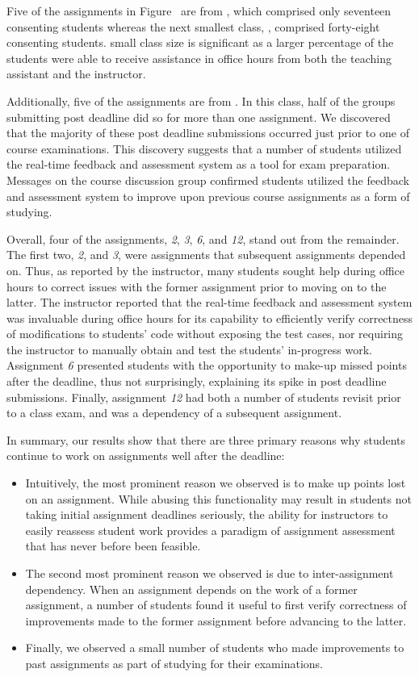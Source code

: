 Five of the assignments in Figure~ are from ,
which comprised only seventeen consenting students whereas the next smallest
class, , comprised forty-eight consenting students. 
small class size is significant as a larger percentage of the students were
able to receive assistance in office hours from both the teaching assistant and
the instructor.

Additionally, five of the assignments are from . In this class, half
of the groups submitting post deadline did so for more than one assignment. We
discovered that the majority of these post deadline submissions occurred just
prior to one of  course examinations. This discovery suggests that
a number of students utilized the real-time feedback and assessment system as a
tool for exam preparation. Messages on the course discussion group confirmed
students utilized the feedback and assessment system to improve upon previous
course assignments as a form of studying.

Overall, four of the assignments, \emph{2}, \emph{3}, \emph{6}, and \emph{12},
stand out from the remainder. The first two, \emph{2}, and \emph{3}, were
assignments that subsequent assignments depended on. Thus, as reported by the
instructor, many students sought help during office hours to correct issues
with the former assignment prior to moving on to the latter. The instructor
reported that the real-time feedback and assessment system was invaluable
during office hours for its capability to efficiently verify correctness of
modifications to students' code without exposing the test cases, nor requiring
the instructor to manually obtain and test the students' in-progress
work. Assignment \emph{6} presented students with the opportunity to make-up
missed points after the deadline, thus not surprisingly, explaining its spike
in post deadline submissions. Finally, assignment \emph{12} had both a number
of students revisit prior to a class exam, and was a dependency of a subsequent
assignment.

In summary, our results show that there are three primary reasons why students
continue to work on assignments well after the deadline:

\begin{itemize}
\item Intuitively, the most prominent reason we observed is to make up points
  lost on an assignment. While abusing this functionality may result in
  students not taking initial assignment deadlines seriously, the ability for
  instructors to easily reassess student work provides a paradigm of assignment
  assessment that has never before been feasible.
\item The second most prominent reason we observed is due to inter-assignment
  dependency. When an assignment depends on the work of a former assignment, a
  number of students found it useful to first verify correctness of
  improvements made to the former assignment before advancing to the latter.
\item Finally, we observed a small number of students who made improvements to
  past assignments as part of studying for their examinations.
\end{itemize}

